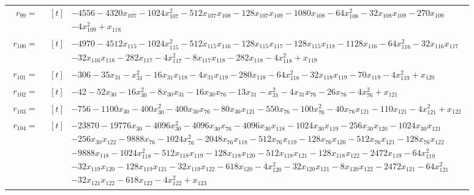 \begin{longtable}{@{}r p{0.92\linewidth}@{}}
$r_{99}=$ & $\begin{aligned}[t]&-4556-4320x_{107}-1024x_{107}^{2}-512x_{107}x_{108}-128x_{107}x_{109}-1080x_{108}-64x_{108}^{2}-32x_{108}x_{109}-270x_{109}\\[-1pt] &-4x_{109}^{2}+x_{118}\end{aligned}$ \\[2pt]
$r_{100}=$ & $\begin{aligned}[t]&-4970-4512x_{115}-1024x_{115}^{2}-512x_{115}x_{116}-128x_{115}x_{117}-128x_{115}x_{118}-1128x_{116}-64x_{116}^{2}-32x_{116}x_{117}\\[-1pt] &-32x_{116}x_{118}-282x_{117}-4x_{117}^{2}-8x_{117}x_{118}-282x_{118}-4x_{118}^{2}+x_{119}\end{aligned}$ \\[2pt]
$r_{101}=$ & $\begin{aligned}[t]&-306-35x_{31}-x_{31}^{2}-16x_{31}x_{118}-4x_{31}x_{119}-280x_{118}-64x_{118}^{2}-32x_{118}x_{119}-70x_{119}-4x_{119}^{2}+x_{120}\end{aligned}$ \\[2pt]
$r_{102}=$ & $\begin{aligned}[t]&-42-52x_{30}-16x_{30}^{2}-8x_{30}x_{31}-16x_{30}x_{76}-13x_{31}-x_{31}^{2}-4x_{31}x_{76}-26x_{76}-4x_{76}^{2}+x_{121}\end{aligned}$ \\[2pt]
$r_{103}=$ & $\begin{aligned}[t]&-756-1100x_{30}-400x_{30}^{2}-400x_{30}x_{76}-80x_{30}x_{121}-550x_{76}-100x_{76}^{2}-40x_{76}x_{121}-110x_{121}-4x_{121}^{2}+x_{122}\end{aligned}$ \\[2pt]
$r_{104}=$ & $\begin{aligned}[t]&-23870-19776x_{30}-4096x_{30}^{2}-4096x_{30}x_{76}-4096x_{30}x_{118}-1024x_{30}x_{119}-256x_{30}x_{120}-1024x_{30}x_{121}\\[-1pt] &-256x_{30}x_{122}-9888x_{76}-1024x_{76}^{2}-2048x_{76}x_{118}-512x_{76}x_{119}-128x_{76}x_{120}-512x_{76}x_{121}-128x_{76}x_{122}\\[-1pt] &-9888x_{118}-1024x_{118}^{2}-512x_{118}x_{119}-128x_{118}x_{120}-512x_{118}x_{121}-128x_{118}x_{122}-2472x_{119}-64x_{119}^{2}\\[-1pt] &-32x_{119}x_{120}-128x_{119}x_{121}-32x_{119}x_{122}-618x_{120}-4x_{120}^{2}-32x_{120}x_{121}-8x_{120}x_{122}-2472x_{121}-64x_{121}^{2}\\[-1pt] &-32x_{121}x_{122}-618x_{122}-4x_{122}^{2}+x_{123}\end{aligned}$ \\[2pt]

\end{longtable}
